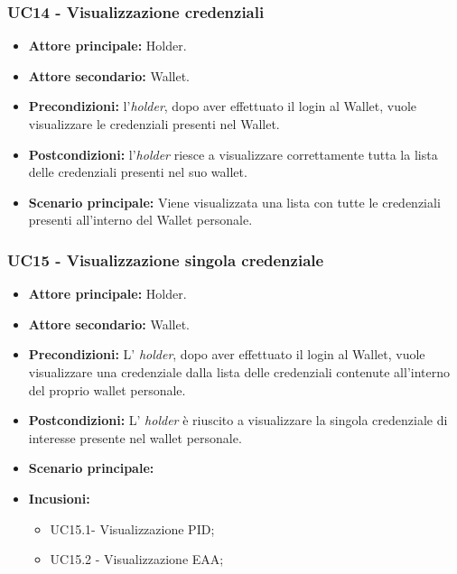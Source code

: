 \subsubsection{UC14 - Visualizzazione credenziali}
\begin{itemize}
    \item \textbf{Attore principale:} Holder.
    \item \textbf{Attore secondario:} Wallet.
    \item \textbf{Precondizioni:} l'\textit{holder}, dopo aver effettuato il login al Wallet, vuole visualizzare le credenziali presenti nel Wallet. 
    \item \textbf{Postcondizioni:} l'\textit{holder} riesce a visualizzare correttamente tutta la lista delle credenziali presenti nel suo wallet. 
    \item \textbf{Scenario principale:} Viene visualizzata una lista con tutte le credenziali presenti all'interno del Wallet personale. 
\end{itemize}


\subsubsection{UC15 - Visualizzazione singola credenziale}
\begin{itemize}
\item \textbf{Attore principale:} Holder.
\item \textbf{Attore secondario:} Wallet. 
\item \textbf{Precondizioni:} L’ \textit{holder}, dopo aver effettuato il login al Wallet, vuole visualizzare una credenziale dalla lista delle credenziali contenute all'interno del proprio wallet personale. 
\item \textbf{Postcondizioni:} L’ \textit{holder} è riuscito a visualizzare la singola credenziale di interesse presente nel wallet personale.
\item \textbf{Scenario principale:} 
\item \textbf{Incusioni:}
    \begin{itemize}
    \item UC15.1- Visualizzazione PID;
    \item UC15.2 - Visualizzazione EAA;
    \end{itemize}
\end{itemize}

